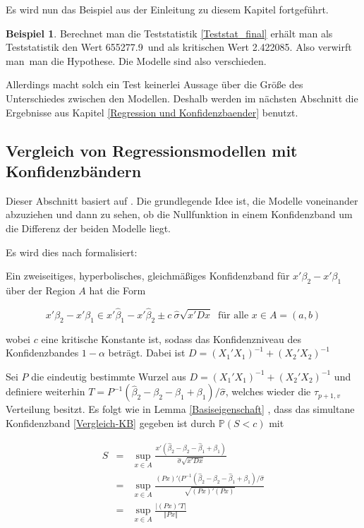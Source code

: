 \documentclass[12pt,a4paper]{article}
\theoremstyle{definition}
\newtheorem{Beispiel}[Definition]{Beispiel}
\theoremstyle{definition}
\theoremstyle{definition}
\theoremstyle{definition}
\newcommand{\TestWert}{655277.9}%
\newcommand{\kritWert}{2.422085}%
\newcommand{\EntscheidungHypothesen}{verwirft man}
\newcommand{\Modellesind}{verschieden}
\begin{document}
Es wird nun das Beispiel aus der Einleitung zu diesem Kapitel fortgeführt.

\begin{Beispiel}
Berechnet man die Teststatistik \eqref{Teststat_final} erhält man als Teststatistik den Wert \TestWert ~und als kritischen Wert \kritWert . Also \EntscheidungHypothesen ~man die Hypothese. Die Modelle sind also \Modellesind .
\end{Beispiel}

Allerdings macht solch ein Test keinerlei Aussage über die Größe des Unterschiedes zwischen den Modellen. Deshalb werden im nächsten Abschnitt die Ergebnisse aus Kapitel \ref{Regression und Konfidenzbaender} benutzt.


\subsection{Vergleich von Regressionsmodellen mit Konfidenzbändern}
\label{Konfidenzbaender vergleich}
Dieser Abschnitt basiert auf \cite[119-121]{Liu64}.
Die grundlegende Idee ist, die Modelle voneinander abzuziehen und dann zu sehen, ob die Nullfunktion in einem Konfidenzband um die Differenz der beiden Modelle liegt.

Es wird dies nach \cite[122]{Liu64} formalisiert: 

Ein zweiseitiges, hyperbolisches, gleichmäßiges Konfidenzband für $x'\beta_2 - x'\beta_1$ über der Region $A$ hat die Form

\begin{equation} \label{Vergleich-KB}
x'\beta_2-x'\beta_1 \in x' \hat{\beta}_1 - x' \hat{\beta}_2 \pm c ~ \hat{\sigma} \sqrt{x' D x} ~ \text{ für alle } x \in A = (a,b)
\end{equation}

wobei $c$ eine kritische Konstante ist, sodass das Konfidenzniveau des Konfidenzbandes $1-\alpha$ beträgt. Dabei ist $D = (X_1'X_1)^{-1} + (X_2'X_2)^{-1}$

Sei $P$ die eindeutig bestimmte Wurzel aus $D = (X_1'X_1)^{-1} + (X_2'X_2)^{-1}$ und definiere weiterhin $T=P^{-1}(\hat{\beta}_2 - \beta_2 - \hat{\beta}_1 + \beta_1)/\hat{\sigma}$, welches wieder die $\tau_{p+1,v}$ Verteilung besitzt. Es folgt wie in Lemma \ref{Basiseigenschaft} , dass das simultane Konfidenzband \eqref{Vergleich-KB} gegeben ist durch $\mathbb{P}(S<c)$ mit

\begin{eqnarray*}
S &=& \sup_{x \in A} \frac{x' (\hat{\beta}_2-\beta_2-\hat{\beta}_1+\beta_1)}{\hat{\sigma}\sqrt{x' D x}}\\
&=& \sup_{x \in A} \frac{(Px)' (P^{-1} (\hat{\beta}_2-\beta_2-\hat{\beta}_1+\beta_1)/\hat{\sigma}}{\sqrt{(Px)'(Px)}} \\
&=& \sup_{x \in A} \frac{\vert (Px)' T \vert}{\Vert Px \Vert}
\end{eqnarray*}
\end{document}
